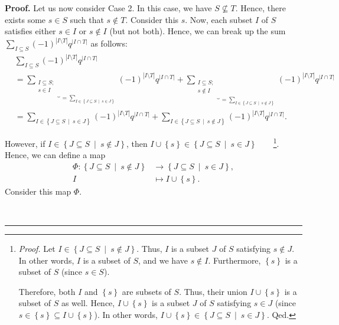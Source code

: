 \documentclass[numbers=enddot,12pt,final,onecolumn,notitlepage]{scrartcl}%
\theoremstyle{definition}
\newenvironment{proof}[1][Proof]{\noindent\textbf{#1.} }{\ \rule{0.5em}{0.5em}}
\let\sumnonlimits\sum
\renewcommand{\sum}{\sumnonlimits\limits}
\newenvironment{verlong}{}{}
\begin{document}
\begin{verlong}
\begin{proof}
Let us now consider Case 2. In this case, we have $S\not \subseteq T$. Hence,
there exists some $s\in S$ such that $s\notin T$. Consider this $s$. Now, each
subset $I$ of $S$ satisfies either $s\in I$ or $s\notin I$ (but not both).
Hence, we can break up the sum $\sum_{I\subseteq S}\left(  -1\right)
^{\left\vert I\setminus T\right\vert }q^{\left\vert I\cap T\right\vert }$ as
follows:%
\begin{align*}
&  \sum_{I\subseteq S}\left(  -1\right)  ^{\left\vert I\setminus T\right\vert
}q^{\left\vert I\cap T\right\vert }\\
&  =\underbrace{\sum_{\substack{I\subseteq S;\\s\in I}}}_{=\sum_{I\in\left\{
J\subseteq S\ \mid\ s\in J\right\}  }}\left(  -1\right)  ^{\left\vert
I\setminus T\right\vert }q^{\left\vert I\cap T\right\vert }+\underbrace{\sum
_{\substack{I\subseteq S;\\s\notin I}}}_{=\sum_{I\in\left\{  J\subseteq
S\ \mid\ s\notin J\right\}  }}\left(  -1\right)  ^{\left\vert I\setminus
T\right\vert }q^{\left\vert I\cap T\right\vert }\\
&  =\sum_{I\in\left\{  J\subseteq S\ \mid\ s\in J\right\}  }\left(  -1\right)
^{\left\vert I\setminus T\right\vert }q^{\left\vert I\cap T\right\vert }%
+\sum_{I\in\left\{  J\subseteq S\ \mid\ s\notin J\right\}  }\left(  -1\right)
^{\left\vert I\setminus T\right\vert }q^{\left\vert I\cap T\right\vert }.
\end{align*}


However, if $I\in\left\{  J\subseteq S\ \mid\ s\notin J\right\}  $, then
$I\cup\left\{  s\right\}  \in\left\{  J\subseteq S\ \mid\ s\in J\right\}
$\ \ \ \ \footnote{\textit{Proof.} Let $I\in\left\{  J\subseteq S\ \mid
\ s\notin J\right\}  $. Thus, $I$ is a subset $J$ of $S$ satisfying $s\notin
J$. In other words, $I$ is a subset of $S$, and we have $s\notin I$.
Furthermore, $\left\{  s\right\}  $ is a subset of $S$ (since $s\in S$).
\par
Therefore, both $I$ and $\left\{  s\right\}  $ are subsets of $S$. Thus, their
union $I\cup\left\{  s\right\}  $ is a subset of $S$ as well. Hence,
$I\cup\left\{  s\right\}  $ is a subset $J$ of $S$ satisfying $s\in J$ (since
$s\in\left\{  s\right\}  \subseteq I\cup\left\{  s\right\}  $). In other
words, $I\cup\left\{  s\right\}  \in\left\{  J\subseteq S\ \mid\ s\in
J\right\}  $. Qed.}. Hence, we can define a map%
\begin{align*}
\Phi:\left\{  J\subseteq S\ \mid\ s\notin J\right\}   &  \rightarrow\left\{
J\subseteq S\ \mid\ s\in J\right\}  ,\\
I  &  \mapsto I\cup\left\{  s\right\}  .
\end{align*}
Consider this map $\Phi$.


\end{proof}
\end{verlong}
\end{document}
